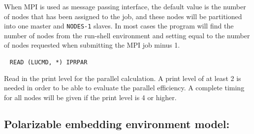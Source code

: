 \begin{description}
When MPI is used as message passing interface, the
default value is the number of nodes that has been assigned to the
job, and these nodes will be partitioned into one master and
\verb|NODES-1| slaves. In most cases the program will
find the number of nodes from the run-shell environment and setting
equal to the number of nodes requested when submitting the MPI job minus 1.

%
%
\item[\Key{PRINT}]\verb| |\newline
\verb|READ (LUCMD, *) IPRPAR|

Read in the print level for the parallel calculation. A print level of
at least 2 is needed in order to be able to evaluate the
parallel efficiency. A complete
timing for all nodes will be
given if the print level is 4 or higher.
\end{description}

\subsection{Polarizable embedding environment model: }
\label{subsec:peqm} 

